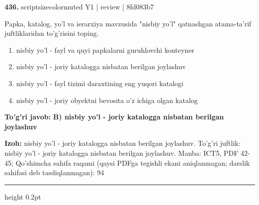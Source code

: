 \documentclass[10pt,a4paper]{article}
\begin{document}
{\bfseries\sffamily\color{ink} 436.} {scriptsizecolor{muted} Y1 | review | 8fd083b7}
\par
Papka, katalog, yo'l va ierarxiya mavzusida "nisbiy yo'l" qatnashgan atama-ta'rif juftliklaridan to'g'risini toping.
\begin{enumerate}[label=\Alph*),leftmargin=9mm]
\item nisbiy yo'l - fayl va quyi papkalarni guruhlovchi konteyner
\item nisbiy yo'l - joriy katalogga nisbatan berilgan joylashuv
\item nisbiy yo'l - fayl tizimi daraxtining eng yuqori katalogi
\item nisbiy yo'l - joriy obyektni bevosita o'z ichiga olgan katalog
\end{enumerate}
\begin{tcolorbox}[enhanced,breakable,colback=teal!4,colframe=teal!60!black,boxrule=0.45pt,arc=1.2mm,left=2.7mm,right=2.7mm,top=1.8mm,bottom=1.8mm,before skip=2mm,after skip=2mm]
{\bfseries\sffamily\color{teal}To'g'ri javob:} \textbf{B) nisbiy yo'l - joriy katalogga nisbatan berilgan joylashuv}
\par\smallskip
{\bfseries Izoh:} nisbiy yo'l - joriy katalogga nisbatan berilgan joylashuv. To'g'ri juftlik: nisbiy yo'l - joriy katalogga nisbatan berilgan joylashuv. Manba: ICT5, PDF 42-45; Qo'shimcha sahifa raqami (qaysi PDFga tegishli ekani aniqlanmagan; darslik sahifasi deb tasdiqlanmagan): 94
\end{tcolorbox}
\vspace{2mm}\hrule height 0.2pt\vspace{3mm}
\end{document}
